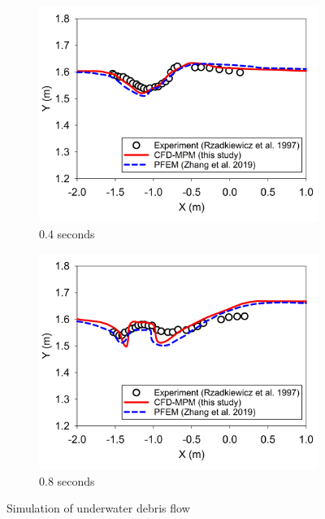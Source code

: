 \documentclass[preprint,12pt]{elsarticle}
\begin{document}
%
%
\begin{figure}
\center
\begin{subfigure}[c]{0.5\linewidth}
\includegraphics[width=\linewidth]{0.4swater.jpg}
\caption{0.4 seconds}
\label{0.4swater}
\end {subfigure}\hfill    
\begin{subfigure}[d]{0.5\linewidth}
\includegraphics[width=\linewidth]{0.8swater.jpg}
\caption{0.8 seconds}
\label{0.8swater}
\end {subfigure}
\caption{Simulation of underwater debris flow}
\label{watersurface}
\end {figure}
\end{document}

